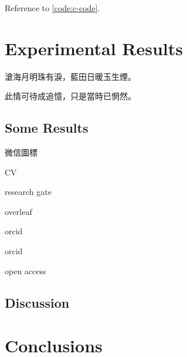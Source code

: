 Reference to \cref{code:c-code}.  

\section{Experimental Results}
\label{ch6:sec:Experimental Results}

\noindent
\begin{minipage}{0.5\textwidth}
滄海月明珠有淚，藍田日暖玉生煙。
\end{minipage}%
\begin{minipage}{0.5\textwidth}
此情可待成追憶，只是當時已惘然。
\end{minipage}

\subsection{Some Results}
\label{ch6:subsec:Some Results}

微信圖標 

CV \aiCV

research gate \aiResearchGate

overleaf \aiOverleaf

orcid \aiOrcid

orcid \textcolor{orcidlogocol}{\aiOrcid}

open access \aiOpenAccess

\subsection{Discussion}
\label{ch6:subsec:Discussion}

\section{Conclusions}
\label{ch6:sec:Conclusions}